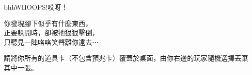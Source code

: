 \linebreak[0]%
\begin{EventCard}{bhh}{WHOOPS!}{哎呀！}
  \begin{CardStory}
    你發現腳下似乎有什麼東西，\\
    正要躲開時，卻被牠狠狠擊倒，\\
    只聽見一陣咯咯笑聲離你遠去⋯
  \end{CardStory}
  請將你所有的道具卡（不包含預兆卡）覆蓋於桌面，由你右邊的玩家隨機選擇丟棄其中一張。\\[0.5em]
\end{EventCard}%
